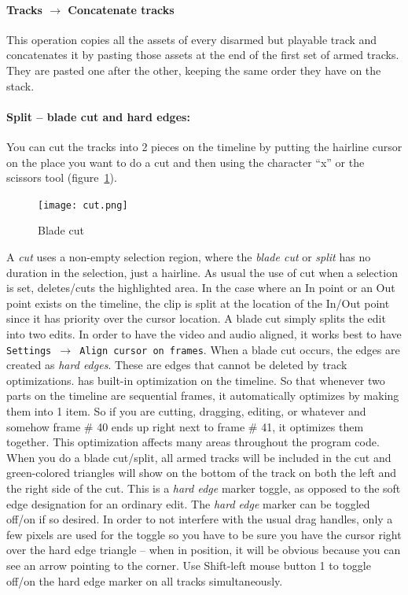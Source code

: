 \paragraph{Tracks $\rightarrow$ Concatenate tracks} This operation
copies all the assets of every disarmed but playable track and
concatenates it by pasting those assets at the end of the first set
of armed tracks. They are pasted one after the other, keeping the
same order they have on the stack.

\paragraph{Split -- blade cut and hard edges:} You can cut the
tracks into 2 pieces on the timeline by putting the hairline cursor
on the place you want to do a cut and then using the character “x”
or the scissors tool (figure~\ref{fig:cut}).

\begin{figure}
  \vspace{-2ex}
  \centering
  \texttt{[image: cut.png]}
  \caption{Blade cut}
  \label{fig:cut}
\end{figure}

A \textit{cut} uses a non-empty selection region, where the
\textit{blade cut} or \textit{split} has no duration in the
selection, just a hairline.  As usual the use of cut when a
selection is set, deletes/cuts the highlighted area.  In the case
where an In point or an Out point exists on the timeline, the clip
is split at the location of the In/Out point since it has priority
over the cursor location.  A blade cut simply splits the edit into
two edits.  In order to have the video and audio aligned, it works
best to have \texttt{Settings $\rightarrow$ Align cursor on
  frames}.  When a blade cut occurs, the edges are created as
\textit{hard edges}.  These are edges that cannot be deleted by
track optimizations.
%
\CGG{} has built-in optimization on the timeline.  So that whenever
two parts on the timeline are sequential frames, it automatically
optimizes by making them into 1 item.  So if you are cutting,
dragging, editing, or whatever and somehow frame \# 40 ends up
right next to frame \# 41, it optimizes them together.  This
optimization affects many areas throughout the program code.  When
you do a blade cut/split, all armed tracks will be included in the
cut and green-colored triangles will show on the bottom of the
track on both the left and the right side of the cut.  This is a
\textit{hard edge} marker toggle, as opposed to the soft edge
designation for an ordinary edit.  The \textit{hard edge} marker
can be toggled off/on if so desired.  In order to not interfere
with the usual drag handles, only a few pixels are used for the
toggle so you have to be sure you have the cursor right over the
hard edge triangle -- when in position, it will be obvious because
you can see an arrow pointing to the corner.  Use Shift-left mouse
button 1 to toggle off/on the hard edge marker on all tracks
simultaneously.


